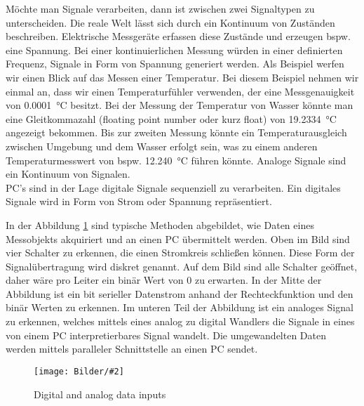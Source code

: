 \documentclass[
fontsize=12pt, 
paper=a4, 
BCOR=10mm, 
twoside=false,
 DIV=10, 
 headsepline, 
 footsepline
 ]{scrartcl}
\def\bild#1#2#3#4#5#6{%
\begin{figure}[h!] %
\centering
\texttt{[image: Bilder/\#2]}
\vspace{#3}
\caption[#4]{#5}\label{#6}
\end{figure}
}
\begin{document}
Möchte man Signale verarbeiten, dann ist zwischen zwei Signaltypen zu unterscheiden. Die reale Welt lässt sich durch ein Kontinuum von Zuständen beschreiben. Elektrische Messgeräte erfassen diese Zustände und erzeugen bspw. eine Spannung. Bei einer kontinuierlichen Messung würden in einer definierten Frequenz, Signale in Form von Spannung generiert werden. Als Beispiel werfen wir einen Blick auf das Messen einer Temperatur. Bei diesem Beispiel nehmen wir einmal an, dass wir einen Temperaturfühler verwenden, der eine Messgenauigkeit von \SI{0.0001}{\degreeCelsius} besitzt. Bei der Messung der Temperatur von Wasser könnte man eine Gleitkommazahl (floating point number oder kurz float) von \SI{19,2334}{\degreeCelsius} angezeigt bekommen. Bis zur zweiten Messung könnte ein Temperaturausgleich zwischen Umgebung und dem Wasser erfolgt sein, was zu einem anderen Temperaturmesswert von bspw. \SI{12,240}{\degreeCelsius} führen könnte. Analoge Signale sind ein Kontinuum von Signalen. \\

PC's sind in der Lage digitale Signale sequenziell zu verarbeiten. Ein digitales Signale wird in Form von Strom oder Spannung repräsentiert. 


In der Abbildung \ref{analog_digital_data_input} sind typische Methoden abgebildet, wie Daten eines Messobjekts akquiriert und an einen PC übermittelt werden. Oben im Bild sind vier Schalter zu erkennen, die einen Stromkreis schließen können. Diese Form der Signalübertragung wird diskret genannt. Auf dem Bild sind alle Schalter geöffnet, daher wäre pro Leiter ein binär Wert von 0 zu erwarten. In der Mitte der Abbildung ist ein bit serieller Datenstrom anhand der Rechteckfunktion und den binär Werten zu erkennen. Im unteren Teil der Abbildung ist ein analoges Signal zu erkennen, welches mittels eines analog zu digital Wandlers die Signale in eines von einem PC interpretierbares Signal wandelt. Die umgewandelten Daten werden mittels paralleler Schnittstelle an einen PC sendet.  

\bild{0.8}
{analog_digital_data_input.png}
{0em}
{Digital and analog data inputs \cite{hughes2010real}}
{Digital and analog data inputs \cite{hughes2010real}}
{analog_digital_data_input}
\end{document}
